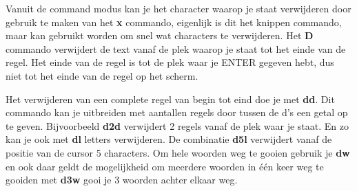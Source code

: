 Vanuit de command modus kan je het character waarop je staat verwijderen door gebruik te maken van het \textbf{x} commando, eigenlijk is dit het knippen commando, maar kan gebruikt worden om snel wat characters te verwijderen. Het \textbf{D} commando verwijdert de text vanaf de plek waarop je staat tot het einde van de regel. Het einde van de regel is tot de plek waar je \textsc{ENTER} gegeven hebt, dus niet tot het einde van de regel op het scherm.

Het verwijderen van een complete regel van begin tot eind doe je met \textbf{dd}. Dit commando kan je uitbreiden met aantallen regels door tussen de d's een getal op te geven. Bijvoorbeeld \textbf{d2d} verwijdert 2 regels vanaf de plek waar je staat. En zo kan je ook met \textbf{dl} letters verwijderen. De combinatie \textbf{d5l} verwijdert vanaf de positie van de cursor 5 characters. Om hele woorden weg te gooien gebruik je \textbf{dw} en ook daar geldt de mogelijkheid om meerdere woorden in \'e\'en keer weg te gooiden met \textbf{d3w} gooi je 3 woorden achter elkaar weg.
